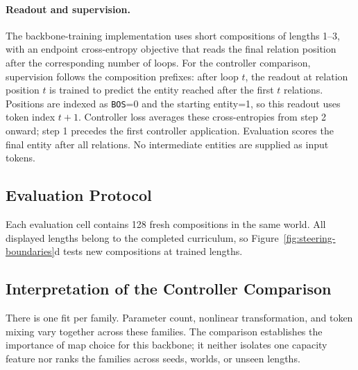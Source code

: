 \documentclass{article}
\begin{document}
\paragraph{Readout and supervision.}
The backbone-training implementation uses short compositions of lengths 1--3, with an endpoint cross-entropy objective that reads the final relation position after the corresponding number of loops. For the controller comparison, supervision follows the composition prefixes: after loop $t$, the readout at relation position $t$ is trained to predict the entity reached after the first $t$ relations. Positions are indexed as \texttt{BOS}=0 and the starting entity=1, so this readout uses token index $t+1$. Controller loss averages these cross-entropies from step 2 onward; step 1 precedes the first controller application. Evaluation scores the final entity after all relations. No intermediate entities are supplied as input tokens.

\subsection{Evaluation Protocol}
Each evaluation cell contains 128 fresh compositions in the same world. All displayed lengths belong to the completed curriculum, so Figure~\ref{fig:steering-boundaries}d tests new compositions at trained lengths.

\subsection{Interpretation of the Controller Comparison}
There is one fit per family. Parameter count, nonlinear transformation, and token mixing vary together across these families. The comparison establishes the importance of map choice for this backbone; it neither isolates one capacity feature nor ranks the families across seeds, worlds, or unseen lengths.
\end{document}
